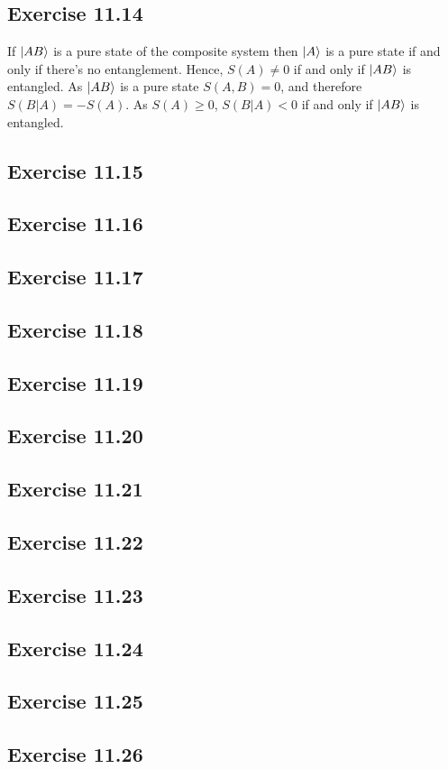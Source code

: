 \documentclass[a4paper,12pt]{article}
\begin{document}
\subsection*{Exercise 11.14}
If $\ket{AB}$ is a pure state of the composite system then $\ket{A}$ is a pure state
if and only if there's no entanglement. Hence, $S(A)\neq 0$ if and only if $\ket{AB}$ is
entangled. As $\ket{AB}$ is a pure state $S(A,B)=0$, and therefore
$S(B|A)=-S(A)$. As $S(A)\geq 0$, $S(B|A)<0$ if and only if $\ket{AB}$ is entangled.
\subsection*{Exercise 11.15}
\subsection*{Exercise 11.16}
\subsection*{Exercise 11.17}
\subsection*{Exercise 11.18}
\subsection*{Exercise 11.19}
\subsection*{Exercise 11.20}
\subsection*{Exercise 11.21}
\subsection*{Exercise 11.22}
\subsection*{Exercise 11.23}
\subsection*{Exercise 11.24}
\subsection*{Exercise 11.25}
\subsection*{Exercise 11.26}
\end{document}
